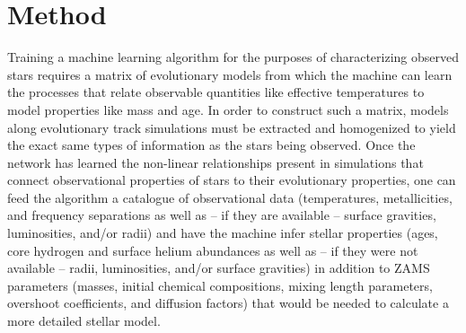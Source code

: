 \documentclass[manuscript]{aastex}
\begin{document}
\section{Method} \label{sec:Method} 
Training a machine learning algorithm for the purposes of characterizing observed stars requires a matrix of evolutionary models from which the machine can learn the processes that relate observable quantities like effective temperatures to model properties like mass and age. In order to construct such a matrix, models along evolutionary track simulations must be extracted and homogenized to yield the exact same types of information as the stars being observed. Once the network has learned the non-linear relationships present in simulations that connect observational properties of stars to their evolutionary properties, one can feed the algorithm a catalogue of observational data (temperatures, metallicities, and frequency separations as well as -- if they are available -- surface gravities, luminosities, and/or radii) and have the machine infer stellar properties (ages, core hydrogen and surface helium abundances as well as -- if they were not available -- radii, luminosities, and/or surface gravities) in addition to ZAMS parameters (masses, initial chemical compositions, mixing length parameters, overshoot coefficients, and diffusion factors) that would be needed to calculate a more detailed stellar model. 

\end{document}

